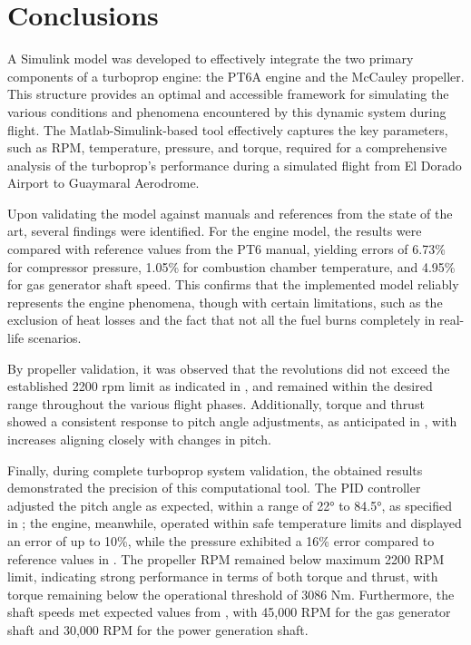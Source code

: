 \documentclass{Format}
\begin{document}
\section{Conclusions}
A Simulink model was developed to effectively integrate the two primary components of a turboprop engine: the PT6A engine and the McCauley propeller. This structure provides an optimal and accessible framework for simulating the various conditions and phenomena encountered by this dynamic system during flight. The Matlab-Simulink-based tool effectively captures the key parameters, such as RPM, temperature, pressure, and torque, required for a comprehensive analysis of the turboprop's performance during a simulated flight from El Dorado Airport to Guaymaral Aerodrome.

Upon validating the model against manuals and references from the state of the art, several findings were identified. For the engine model, the results were compared with reference values from the PT6 manual, yielding errors of 6.73\% for compressor pressure, 1.05\% for combustion chamber temperature, and 4.95\% for gas generator shaft speed. This confirms that the implemented model reliably represents the engine phenomena, though with certain limitations, such as the exclusion of heat losses and the fact that not all the fuel burns completely in real-life scenarios.

By propeller validation, it was observed that the revolutions did not exceed the established 2200 rpm limit as indicated in \cite{Piper1998}, and remained within the desired range throughout the various flight phases. Additionally, torque and thrust showed a consistent response to pitch angle adjustments, as anticipated in \cite{Castellanos2023Propeller}, with increases aligning closely with changes in pitch.

Finally, during complete turboprop system validation, the obtained results demonstrated the precision of this computational tool. The PID controller adjusted the pitch angle as expected, within a range of 22° to 84.5°, as specified in \cite{Castellanos2023Propeller}; the engine, meanwhile, operated within safe temperature limits and displayed an error of up to 10\%, while the pressure exhibited a 16\% error compared to reference values in \cite{Castellanos2019}. The propeller RPM remained below maximum 2200 RPM limit, indicating strong performance in terms of both torque and thrust, with torque remaining below the operational threshold of 3086 Nm. Furthermore, the shaft speeds met expected values from \cite{Piper1998}, with 45,000 RPM for the gas generator shaft and 30,000 RPM for the power generation shaft.
\end{document}
